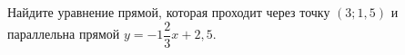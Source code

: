 \begin{ex}
	\begin{condition}
		Найдите уравнение прямой, которая проходит через точку \( (3;1,5) \) и параллельна прямой \( y=-1\dfrac{2}{3}x+2,5 \).
	\end{condition}
\end{ex}